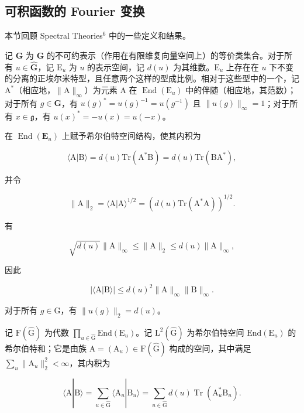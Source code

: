 \subsection{可积函数的 Fourier 变换}

本节回顾 Spectral Theories\(^{6}\) 中的一些定义和结果。

记 \(\hat{\mathbf{G}}\) 为 \(\mathbf{G}\) 的不可约表示（作用在有限维复向量空间上）的等价类集合。对于所有 \(u\in \hat{\mathbf{G}}\)，记 \(\mathrm{E}_u\) 为 \(u\) 的表示空间，记 \(d(u)\) 为其维数。\(\mathrm{E}_u\) 上存在在 \(u\) 下不变的分离的正埃尔米特型，且任意两个这样的型成比例。相对于这些型中的一个，记 \(\mathrm{A}^*\)（相应地，\(\| \mathrm{A}\|_{\infty}\)）为元素 \(\mathrm{A}\) 在 \(\operatorname {End}(\mathrm{E}_u)\) 中的伴随（相应地，其范数）；对于所有 \(g\in \mathbf{G}\)，有 \(u(g)^{*} = u(g)^{-1} = u(g^{-1})\) 且 \(\| u(g)\|_{\infty} = 1\)；对于所有 \(x\in \mathfrak{g}\)，有 \(u(x)^{*} = -u(x) = u(-x)\)。

在 \(\operatorname{End}(\mathbf{E}_u)\) 上赋予希尔伯特空间结构，使其内积为

\[
\langle \mathrm{A} | \mathrm{B} \rangle = d (u) \mathrm{Tr} (\mathrm{A} ^ {*} \mathrm{B}) = d (u) \mathrm{Tr} (\mathrm{BA} ^ {*}),\tag{1}
\]

并令

\[
\| \mathrm{A} \| _ {2} = \langle \mathrm{A} | \mathrm{A} \rangle^ {1 / 2} = (d (u) \mathrm{Tr} (\mathrm{A} ^ {*} \mathrm{A})) ^ {1 / 2}.\tag{2}
\]

有

\[
\sqrt {d (u)} \| \mathrm{A} \| _ {\infty} \leq \| \mathrm{A} \| _ {2} \leq d (u) \| \mathrm{A} \| _ {\infty},\tag{3}
\]

因此

\[
| \langle \mathrm{A} | \mathrm{B} \rangle | \leq d (u) ^ {2} \| \mathrm{A} \| _ {\infty} \| \mathrm{B} \| _ {\infty}.\tag{4}
\]

对于所有 \(g \in \mathrm{G}\)，有 \(\| u(g) \|_2 = d(u)\)。

记 \(\mathrm{F}(\hat{\mathrm{G}})\) 为代数 \(\prod_{u\in \hat{\mathrm{G}}}\mathrm{End}(\mathrm{E}_u)\)。记 \(\mathrm{L}^2 (\hat{\mathrm{G}})\) 为希尔伯特空间 \(\mathrm{End}(\mathrm{E}_u)\) 的希尔伯特和；它是由族 \(\mathrm{A} = (\mathrm{A}_u)\in \mathrm{F}(\hat{\mathrm{G}})\) 构成的空间，其中满足 \(\sum_{u}\| \mathrm{A}_{u}\|_{2}^{2} < \infty\)，其内积为

\[
\langle \mathrm{A} | \mathrm{B} \rangle = \sum_ {u \in \hat {\mathrm{G}}} \langle \mathrm{A} _ {u} | \mathrm{B} _ {u} \rangle = \sum_ {u \in \hat {\mathrm{G}}} d (u) \operatorname{Tr} (\mathrm{A} _ {u} ^ {*} \mathrm{B} _ {u}).\tag{5}
\]

